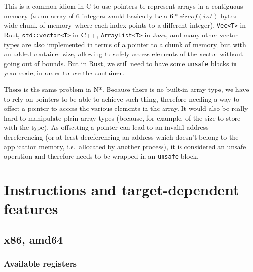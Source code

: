 This is a common idiom in C to use pointers to represent arrays in a contiguous memory (so an array of 6 integers would basically be a $6 * sizeof(int)$ bytes wide chunk of memory, where each index points to a different integer).
\texttt{Vec<T>} in Rust, \texttt{std::vector<T>} in C++, \texttt{ArrayList<T>} in Java, and many other vector types are also implemented in terms of a pointer to a chunk of memory, but with an added container size, allowing to safely access elements of the vector without going out of bounds.
But in Rust, we still need to have some \texttt{unsafe} blocks in your code, in order to use the container.

There is the same problem in N*.
Because there is no built-in array type, we have to rely on pointers to be able to achieve such thing, therefore needing a way to offset a pointer to access the various elements in the array.
It would also be really hard to manipulate plain array types (because, for example, of the size to store with the type).
As offsetting a pointer can lead to an invalid address dereferencing (or at least dereferencing an address which doesn't belong to the application memory, i.e.\ allocated by another process), it is considered an unsafe operation and therefore needs to be wrapped in an \texttt{unsafe} block.

\chapter{Instructions and target-dependent features}\label{chap:nstar-specific}

\section{x86, amd64}\label{sec:nstar-specific-x86amd64}

\subsection{Available registers}\label{subsec:nstar-specific-x86amd64-registers}

